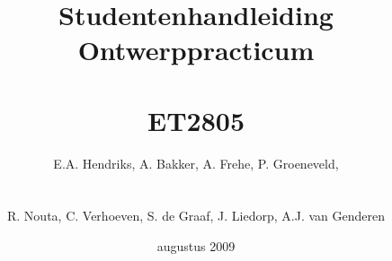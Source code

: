 \documentclass[11pt,twoside,a4paper,fancyheadings]{article}
\newcommand{\hfdaanduiding}{Hoofdstuk~}
\begin{document}
\title{Studentenhandleiding Ontwerppracticum\\
~\\
\Large ET2805}
\date{augustus 2009}
\author{\centerline{E.A. Hendriks, A. Bakker, A. Frehe, P. Groeneveld, } 
\\
\centerline{R. Nouta, C. Verhoeven, S. de Graaf, J. Liedorp, A.J. van Genderen}}
\maketitle
\thispagestyle{empty}
\clearpage
\tableofcontents
\cleardoublepage
\pagestyle{fancy}








\appendix
\renewcommand{\hfdaanduiding}{Appendix~}







%
\clearpage
{}


\end{document}
